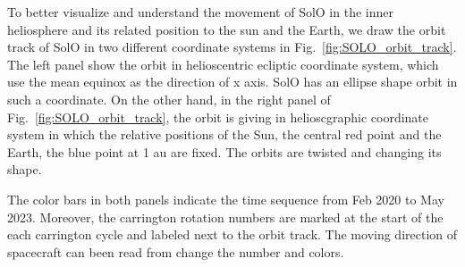 To better visualize and understand the movement of \ac{SolO} in the inner heliosphere and its related position to the sun and the Earth, we draw the orbit track of \ac{SolO} in two different coordinate systems in Fig.~\ref{fig:SOLO_orbit_track}. The left panel show the orbit in helioscentric ecliptic coordinate system, which use the mean equinox as the direction of x axis. \ac{SolO} has an ellipse shape orbit in such a coordinate. On the other hand, in the right panel of Fig.~\ref{fig:SOLO_orbit_track}, the orbit is giving in helioscgraphic coordinate system in which the relative positions of the Sun, the central red point and the Earth, the blue point at 1 au are fixed. The orbits are twisted and changing its shape.

The color bars in both panels indicate the time sequence from Feb 2020 to May 2023. Moreover, the carrington rotation numbers are marked at the start of the each carrington cycle and labeled next to the orbit track. The moving direction of spacecraft can been read from change the number and colors.






